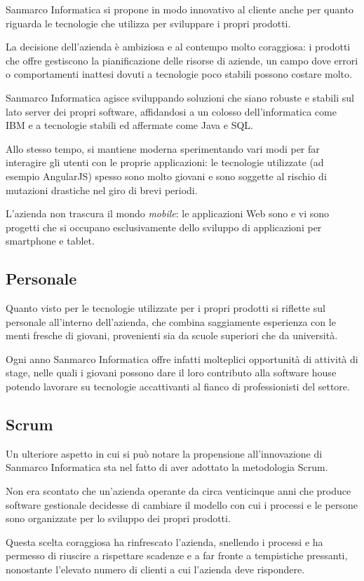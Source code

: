 Sanmarco Informatica si propone in modo innovativo al cliente anche per quanto
riguarda le tecnologie che utilizza per sviluppare i propri prodotti.

La decisione dell'azienda è ambiziosa e al contempo molto coraggiosa: i
prodotti che offre gestiscono la pianificazione delle risorse di aziende, un
campo dove errori o comportamenti inattesi dovuti a tecnologie poco stabili
possono costare molto.

Sanmarco Informatica agisce sviluppando soluzioni che siano robuste e stabili
sul lato server dei propri software, affidandosi a un colosso dell'informatica
come IBM e a tecnologie stabili ed affermate come Java e SQL.

Allo stesso tempo, si mantiene moderna sperimentando vari modi per far
interagire gli utenti con le proprie applicazioni: le tecnologie utilizzate (ad
esempio AngularJS) spesso sono molto giovani e sono soggette al rischio di
mutazioni drastiche nel giro di brevi periodi.

L'azienda non trascura il mondo \emph{mobile}: le applicazioni Web sono
 e vi sono progetti che si occupano esclusivamente dello
sviluppo di applicazioni per smartphone e tablet.

\subsection{Personale} \mbox{}

Quanto visto per le tecnologie utilizzate per i propri prodotti si riflette sul
personale all'interno dell'azienda, che combina saggiamente esperienza con le
menti fresche di giovani, provenienti sia da scuole superiori che da
università.

Ogni anno Sanmarco Informatica offre infatti molteplici opportunità di attività
di stage, nelle quali i giovani possono dare il loro contributo alla software
house potendo lavorare su tecnologie accattivanti al fianco di professionisti
del settore.

\subsection{Scrum} \mbox{}

Un ulteriore aspetto in cui si può notare la propensione all'innovazione di
Sanmarco Informatica sta nel fatto di aver adottato la metodologia Scrum.

Non era scontato che un'azienda operante da circa venticinque anni che produce
software gestionale decidesse di cambiare il modello con cui i processi e le
persone sono organizzate per lo sviluppo dei propri prodotti.

Questa scelta coraggiosa ha rinfrescato l'azienda, snellendo i processi e ha
permesso di riuscire a rispettare scadenze e a far fronte a tempistiche
pressanti, nonostante l'elevato numero di clienti a cui l'azienda deve
rispondere.
